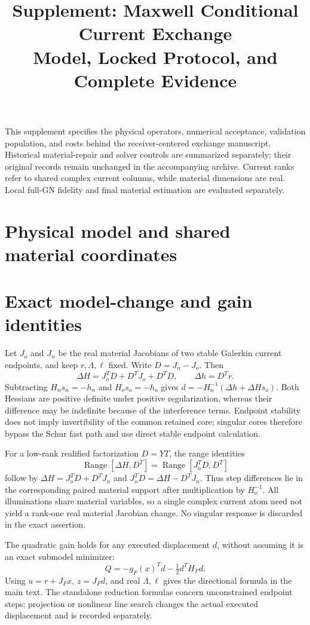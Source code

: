 \documentclass[11pt]{article}
\title{Supplement: Maxwell Conditional Current Exchange\\Model, Locked Protocol, and Complete Evidence}
\author{}\date{}
\begin{document}
\maketitle
This supplement specifies the physical operators, numerical acceptance, validation population, and costs behind the receiver-centered exchange manuscript. Historical material-repair and solver controls are summarized separately; their original records remain unchanged in the accompanying archive. Current ranks refer to shared complex current columns, while material dimensions are real. Local full-GN fidelity and final material estimation are evaluated separately.
\setcounter{tocdepth}{1}\tableofcontents
\section{Physical model and shared material coordinates}


\section{Exact model-change and gain identities}
Let $J_o$ and $J_n$ be the real material Jacobians of two stable Galerkin current endpoints, and keep $r,\Lambda,\ell$ fixed. Write $D=J_n-J_o$. Then
\[
\Delta H=J_o^TD+D^TJ_o+D^TD,\qquad\Delta h=D^Tr.
\]
Subtracting $H_ns_n=-h_n$ and $H_os_o=-h_o$ gives $d=-H_n^{-1}(\Delta h+\Delta Hs_o)$. Both Hessians are positive definite under positive regularization, whereas their difference may be indefinite because of the interference terms. Endpoint stability does not imply invertibility of the common retained core; singular cores therefore bypass the Schur fast path and use direct stable endpoint calculation.

For a low-rank realified factorization $D=YT$, the range identities
\[
\operatorname{Range}[\Delta H,D^T]=\operatorname{Range}[J_o^TD,D^T]
\]
follow by $\Delta H=J_o^TD+D^TJ_n$ and $J_o^TD=\Delta H-D^TJ_n$. Thus step differences lie in the corresponding paired material support after multiplication by $H_o^{-1}$. All illuminations share material variables, so a single complex current atom need not yield a rank-one real material Jacobian change. No singular response is discarded in the exact assertion.

The quadratic gain holds for any executed displacement $d$, without assuming it is an exact submodel minimizer:
\[
Q=-g_F(x)^Td-\tfrac12d^TH_Fd.
\]
Using $u=r+J_Fx$, $z=J_Fd$, and real $\Lambda,\ell$ gives the directional formula in the main text. The standalone reduction formulas concern unconstrained endpoint steps; projection or nonlinear line search changes the actual executed displacement and is recorded separately.
\end{document}
